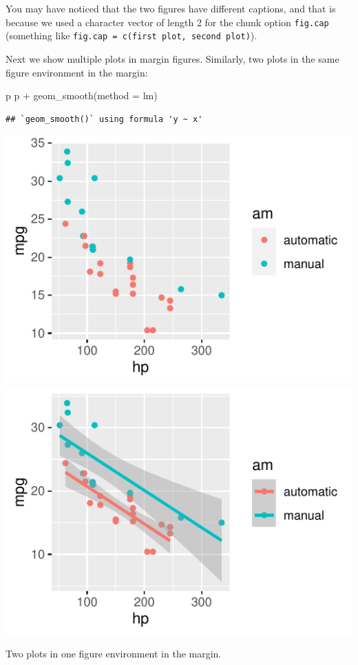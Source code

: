 \documentclass[]{tufte-handout}
\newenvironment{Shaded}{}{}
\newcommand{\AttributeTok}[1]{\textcolor[rgb]{0.49,0.56,0.16}{#1}}
\newcommand{\FunctionTok}[1]{\textcolor[rgb]{0.02,0.16,0.49}{#1}}
\newcommand{\NormalTok}[1]{#1}
\newcommand{\SpecialCharTok}[1]{\textcolor[rgb]{0.25,0.44,0.63}{#1}}
\newcommand{\StringTok}[1]{\textcolor[rgb]{0.25,0.44,0.63}{#1}}
\begin{document}
You may have noticed that the two figures have different captions, and
that is because we used a character vector of length 2 for the chunk
option \texttt{fig.cap} (something like
\texttt{fig.cap\ =\ c(\textquotesingle{}first\ plot\textquotesingle{},\ \textquotesingle{}second\ plot\textquotesingle{})}).

Next we show multiple plots in margin figures. Similarly, two plots in
the same figure environment in the margin:

\begin{Shaded}
\begin{Highlighting}[]
\NormalTok{p}
\NormalTok{p }\SpecialCharTok{+} \FunctionTok{geom\_smooth}\NormalTok{(}\AttributeTok{method =} \StringTok{\textquotesingle{}lm\textquotesingle{}}\NormalTok{)}
\end{Highlighting}
\end{Shaded}

\begin{verbatim}
## `geom_smooth()` using formula 'y ~ x'
\end{verbatim}

\begin{marginfigure}
\includegraphics{tufte_files/figure-latex/fig-margin-together-1} \includegraphics{tufte_files/figure-latex/fig-margin-together-2} \caption[Two plots in one figure environment in the margin]{Two plots in one figure environment in the margin.}\label{fig:fig-margin-together}
\end{marginfigure}
\end{document}
